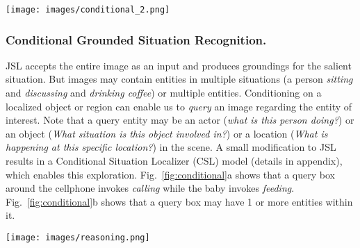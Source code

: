 \documentclass[runningheads]{llncs}
\begin{document}
\begin{figure*}[h!]
\begin{center}
\texttt{[image: images/conditional\_2.png]}
\end{center}
\vspace{-5mm}
   \caption{\textbf{Qualitative results using the Conditional Situation Localizer.} A1 \& A2: The woman is taking part in multiple situations with different entities in the scene. These situations are invoked via different queries. B1 \& B2: Querying the person with a guitar vs querying the group of people also reveals their corresponding situations}
\label{fig:conditional}
\vspace{-5mm}
\end{figure*}

\vspace{-5mm}
\subsubsection{Conditional Grounded Situation Recognition. }
JSL accepts the entire image as an input and produces groundings for the salient situation. But images may contain entities in multiple situations (a person \emph{sitting} and \emph{discussing} and \emph{drinking coffee}) or multiple entities. Conditioning on a localized object or region can enable us to \textit{query} an image regarding the entity of interest. Note that a query entity may be an actor (\emph{what is this person doing?}) or an object (\emph{What situation is this object involved in?}) or a location (\emph{What is happening at this specific location?}) in the scene. A small modification to JSL results in a Conditional Situation Localizer (CSL) model (details in appendix), which enables this exploration. Fig.~\ref{fig:conditional}a shows that a query box around the cellphone invokes \emph{calling} while the baby invokes \emph{feeding}. Fig.~\ref{fig:conditional}b shows that a query box may have 1 or more entities within it.

\begin{figure*}[h!]
\begin{center}
\texttt{[image: images/reasoning.png]}
\end{center}
\vspace{-5mm}
   \caption{\textbf{Grounded semantic chaining.} When a person looks at this image, they may infer several things. A father is teaching his son to use the grill. They are barbecuing some meat with the intent of feeding friends and family who are sitting at a nearby table. Using the conditional localizer followed by spatial and semantic chaining produces situations and relationships-between-situations. These are shown via colored boxes, text and arrows. Conditional inputs are shown with dashed yellow boxes. Notice the similarity between the higher level semantics output by this chaining model and the inferences about the image that you may draw}
\label{fig:chaining}
\vspace{-11mm}
\end{figure*}
\end{document}
